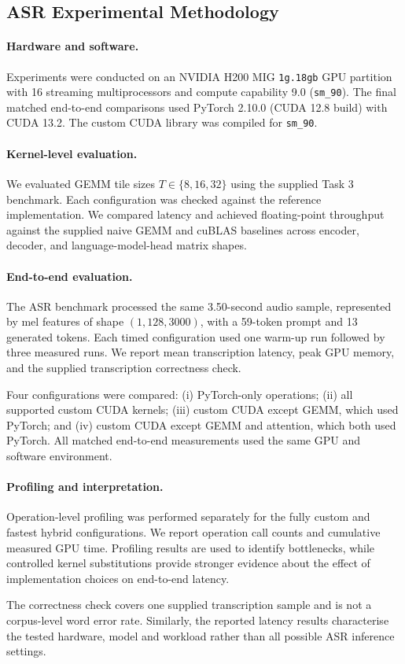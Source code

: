 \subsection{ASR Experimental Methodology}
\label{sec:asr_methodology}

\paragraph{Hardware and software.}
Experiments were conducted on an NVIDIA H200 MIG
\texttt{1g.18gb} GPU partition with 16 streaming multiprocessors
and compute capability 9.0 (\texttt{sm\_90}). The final matched
end-to-end comparisons used PyTorch 2.10.0 (CUDA 12.8 build) with CUDA 13.2.
The custom CUDA library was compiled for \texttt{sm\_90}.

\paragraph{Kernel-level evaluation.}
We evaluated GEMM tile sizes $T\in\{8,16,32\}$ using the
supplied Task 3 benchmark. Each configuration was checked
against the reference implementation. We compared latency
and achieved floating-point throughput against the supplied
naive GEMM and cuBLAS baselines across encoder, decoder,
and language-model-head matrix shapes.

\paragraph{End-to-end evaluation.}
The ASR benchmark processed the same 3.50-second audio
sample, represented by mel features of shape
$(1,128,3000)$, with a 59-token prompt and 13 generated
tokens. Each timed configuration used one warm-up run
followed by three measured runs. We report mean
transcription latency, peak GPU memory, and the
supplied transcription correctness check.

Four configurations were compared: (i) PyTorch-only
operations; (ii) all supported custom CUDA kernels;
(iii) custom CUDA except GEMM, which used PyTorch;
and (iv) custom CUDA except GEMM and attention,
which both used PyTorch. All matched end-to-end
measurements used the same GPU and software environment.

\paragraph{Profiling and interpretation.}
Operation-level profiling was performed separately for
the fully custom and fastest hybrid configurations.
We report operation call counts and cumulative measured
GPU time. Profiling results are used to identify
bottlenecks, while controlled kernel substitutions
provide stronger evidence about the effect of
implementation choices on end-to-end latency.

The correctness check covers one supplied transcription
sample and is not a corpus-level word error rate.
Similarly, the reported latency results characterise
the tested hardware, model and workload rather than
all possible ASR inference settings.
